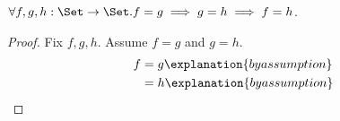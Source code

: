 \begin{proposition}\label{calculation_function_equality}
    $\forall f,g,h:\Set\to\Set. f=g\implies g=h\implies f=h$.
\end{proposition}
\begin{proof}
    Fix $f,g,h$.
    Assume $f=g$ and $g=h$.
    \begin{align*}
        f
            &= g
                \explanation{by assumption}
                \\
            &= h
                \explanation{by assumption}
    \end{align*}
\end{proof}
